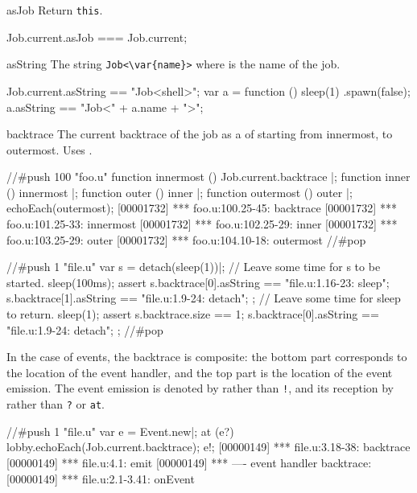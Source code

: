 \begin{urbiscriptapi}
\item[asJob]
  Return \lstinline|this|.
\begin{urbiassert}
Job.current.asJob === Job.current;
\end{urbiassert}


\item[asString] The string \lstinline|Job<\var{name}>| where  is
  the name of the job.
\begin{urbiassert}
Job.current.asString == "Job<shell>";
var a = function () { sleep(1) }.spawn(false);
a.asString == "Job<" + a.name + ">";
\end{urbiassert}

\item[backtrace] The current backtrace of the job as a  of
   starting from innermost, to outermost.  Uses
  .

\begin{urbiscript}
//#push 100 "foo.u"
function innermost () { Job.current.backtrace }|;
function inner ()     { innermost }|;
function outer ()     { inner }|;
function outermost () { outer }|;
echoEach(outermost);
[00001732] *** foo.u:100.25-45: backtrace
[00001732] *** foo.u:101.25-33: innermost
[00001732] *** foo.u:102.25-29: inner
[00001732] *** foo.u:103.25-29: outer
[00001732] *** foo.u:104.10-18: outermost
//#pop

//#push 1 "file.u"
var s = detach(sleep(1))|;
// Leave some time for s to be started.
sleep(100ms);
assert
{
  s.backtrace[0].asString == "file.u:1.16-23: sleep";
  s.backtrace[1].asString == "file.u:1.9-24: detach";
};
// Leave some time for sleep to return.
sleep(1);
assert
{
  s.backtrace.size == 1;
  s.backtrace[0].asString == "file.u:1.9-24: detach";
};
//#pop
\end{urbiscript}

  In the case of events, the backtrace is composite: the bottom part
  corresponds to the location of the event handler, and the top part is the
  location of the event emission.  The event emission is denoted by
   rather than \lstinline|!|, and its reception by
   rather than \lstinline|?| or \lstinline|at|.

\begin{urbiscript}
//#push 1 "file.u"
var e = Event.new|;
at (e?)
  lobby.echoEach(Job.current.backtrace);
e!;
[00000149] *** file.u:3.18-38: backtrace
[00000149] *** file.u:4.1: emit
[00000149] *** ---- event handler backtrace:
[00000149] *** file.u:2.1-3.41: onEvent


\end{urbiscript}
\end{urbiscriptapi}
